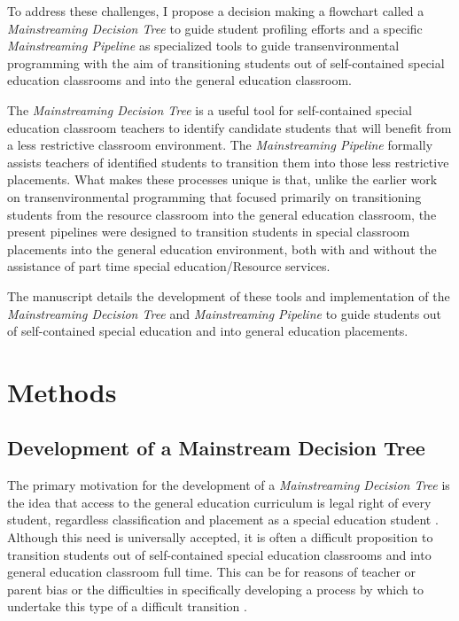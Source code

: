 \documentclass[twoside]{article}
\begin{document}
To address these challenges, I propose a decision making a flowchart called a \textit{Mainstreaming Decision Tree} to guide student profiling efforts and a specific \textit{Mainstreaming Pipeline} as specialized tools to guide transenvironmental programming with the aim of transitioning students out of self-contained special education classrooms and into the general education classroom. 

The \textit{Mainstreaming Decision Tree} is a useful tool for self-contained special education classroom teachers to identify candidate students that will benefit from a less restrictive classroom environment. The \textit{Mainstreaming Pipeline} formally assists teachers of identified students to transition them into those less restrictive placements. What makes these processes unique is that, unlike the earlier work on transenvironmental programming that focused primarily on transitioning students from the resource classroom into the general education classroom, the present pipelines were designed to transition students in special classroom placements into the general education environment, both with and without the assistance of part time special education/Resource services. 

The manuscript details the development of these tools and implementation of the \textit{Mainstreaming Decision Tree} and \textit{Mainstreaming Pipeline} to guide students out of self-contained special education and into general education placements.

\section{Methods}
\subsection{Development of a Mainstream Decision Tree}
The primary motivation for the development of a \textit{Mainstreaming Decision Tree} is the idea that access to the general education curriculum is legal right of every student, regardless classification and placement as a special education student \parencite{hocutt1996effectiveness,johnson2005key,conway1988mainstreaming}. Although this need is universally accepted, it is often a difficult proposition to transition students out of self-contained special education classrooms and into general education classroom full time. This can be for reasons of teacher or parent bias \parencite{skiba2008achieving,marden2013criteria, smith2006classroom, praisner2003attitudes} or the difficulties in specifically developing a process by which to undertake this type of a difficult transition \parencite{cauley2006developing,fuchs1994classroom, kalaci2007students}.
\end{document}
